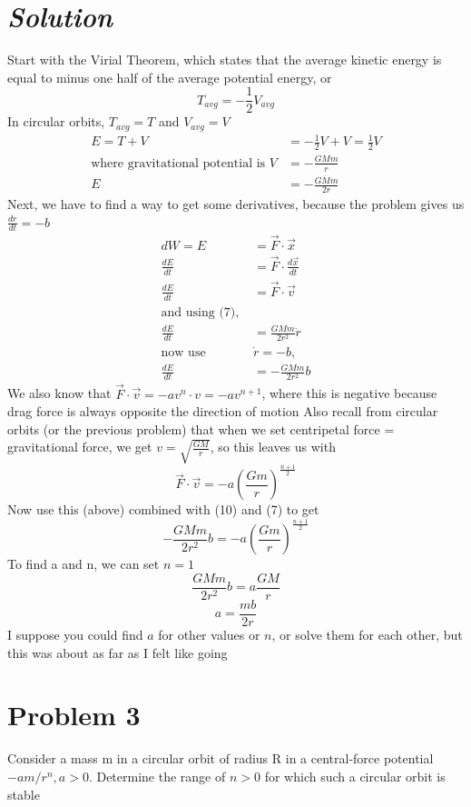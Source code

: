 \documentclass{article}
\begin{document}
\section*{\textit{Solution}} 
Start with the Virial Theorem, which states that the average kinetic energy is equal to minus one half of the average potential energy, or
\[ T_{avg} = -\frac{1}{2}V_{avg} \]
In circular orbits, $ T_{avg} =T$ and $V_{avg} = V$
\begin{align}
	E = T + V &= -\frac{1}{2}V + V = \frac{1}{2}V \\ 
	\text{where gravitational potential is }V &= -\frac{GMm}{r} \\ 
	E &= -\frac{GMm}{2r} 
\end{align}
Next, we have to find a way to get some derivatives, because the problem gives us $\frac{dr}{dt} = -b$
\begin{align}
	dW = E &= \vec{F} \cdot \vec{x} \\
	\frac{dE}{dt} &= \vec{F} \cdot \frac{d\vec{x}}{dt} \\  
	\frac{dE}{dt} &= \vec{F} \cdot \vec{v} \\ 
	\text{and using (7), }& \\
	\frac{dE}{dt} &= \frac{GMm}{2r^2} \dot{r} \\ 
	\text{now use }& \dot{r} = -b, \\ 
	\frac{dE}{dt} &= -\frac{GMm}{2r^2} b
\end{align}
We also know that $\vec{F} \cdot \vec{v} = -av^n \cdot v = -av^{n+1}$, where this is negative because drag force is always opposite the direction of motion
Also recall from circular orbits (or the previous problem) that when we set centripetal force = gravitational force, we get $v = \sqrt{\frac{GM}{r}}$, so this leaves us with
\[ \vec{F} \cdot \vec{v} = -a\left(\frac{Gm}{r}\right)^\frac{n+1}{2} \]
Now use this (above) combined with (10) and (7) to get
\[ -\frac{GMm}{2r^2}b = -a\left(\frac{Gm}{r}\right)^\frac{n+1}{2} \]
To find a and n, we can set $n = 1$
\[ \frac{GMm}{2r^2}b = a\frac{GM}{r} \]
\[\boxed{a = \frac{mb}{2r}} \]
I suppose you could find $a$ for other values or $n$, or solve them for each other, but this was about as far as I felt like going 

\section*{Problem 3 } 
Consider a mass m in a circular orbit of radius R in a central-force potential $-am/r^n,a>0$. Determine the range of $n>0$ for which such a circular orbit is stable
\end{document}
